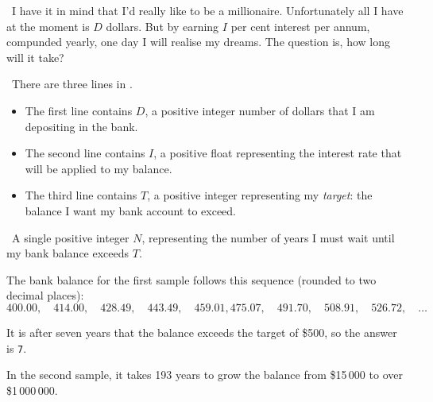 

\Question\ I have it in mind that I'd really like to be a millionaire. Unfortunately all I
have at the moment is $D$ dollars. But by earning $I$ per cent interest per annum,
compunded yearly, one day I will realise my dreams. The question is, how long will it
take?

\Input\ There are three lines in \IN.
\begin{itemize}
  \item The first line contains $D$, a positive integer number of dollars that I am
    depositing in the bank.
  \item The second line contains $I$, a positive float representing the interest rate that
    will be applied to my balance.
  \item The third line contains $T$, a positive integer representing my \emph{target}: the
    balance I want my bank account to exceed.
\end{itemize}

\Output\ A single positive integer $N$, representing the number of years I must wait until
my bank balance exceeds $T$.

\Sample

             {  }

\Explanation The bank balance for the first sample follows this sequence (rounded to two
decimal places): \[
  400.00, \quad 414.00, \quad 428.49, \quad 443.49, \quad 459.01,
  475.07, \quad 491.70, \quad \mathbf{508.91}, \quad 526.72, \quad \dots
\]

It is after seven years that the balance exceeds the target of \$500, so the answer is
\texttt{7}.

In the second sample, it takes 193 years to grow the balance from \$15\,000 to over
\$1\,000\,000.
